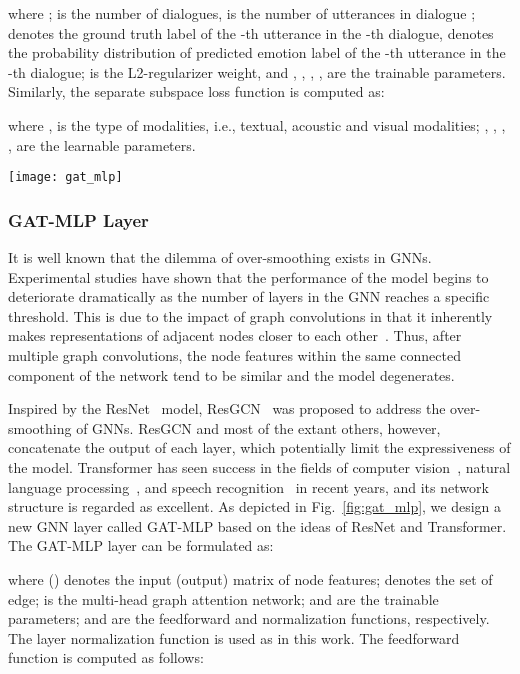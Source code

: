 \documentclass[lettersize,journal]{IEEEtran}
\begin{document}
where ;  is the number of dialogues,  is the number of utterances in dialogue ;  denotes the ground truth label of the -th utterance in the -th dialogue,  denotes the probability distribution of predicted emotion label of the -th utterance in the -th dialogue;  is the L2-regularizer weight, and , , , ,  are the trainable parameters. Similarly, the separate subspace loss function is computed as:


where ,  is the type of modalities, i.e., textual, acoustic and visual modalities; , , , ,  are the learnable parameters.

\begin{figure*}[htbp]
\centering
\texttt{[image: gat\_mlp]}\caption{The structure of the designed GAT-MLP, where the  operation can be placed before  and .  denotes the multi-head graph attention network; the layer normalization function is used for the  in our work.}
\label{fig:gat_mlp}
\end{figure*}

\subsubsection{GAT-MLP Layer}
It is well known that the dilemma of over-smoothing exists in GNNs. Experimental studies have shown that the performance of the model begins to deteriorate dramatically as the number of layers in the GNN reaches a specific threshold. This is due to the impact of graph convolutions in that it inherently makes representations of adjacent nodes closer to each other~\cite{li2018deeper}. Thus, after multiple graph convolutions, the node features within the same connected component of the network tend to be similar and the model degenerates.

Inspired by the ResNet~\cite{he2016deep} model, ResGCN~\cite{li2021deepgcns} was proposed to address the over-smoothing of GNNs. ResGCN and most of the extant others, however, concatenate the output of each layer, which potentially limit the expressiveness of the model. Transformer has seen success in the fields of computer vision~\cite{dosovitskiy2020image, liu2021swin}, natural language processing~\cite{vaswani2017attention}, and speech recognition~\cite{zhang2020transformer} in recent years, and its network structure is regarded as excellent. As depicted in Fig.~\ref{fig:gat_mlp}, we design a new GNN layer called GAT-MLP based on the ideas of ResNet and Transformer. The GAT-MLP layer can be formulated as:

where  () denotes the input (output) matrix of node features;  denotes the set of edge;  is the multi-head graph attention network;  and  are the trainable parameters;  and  are the feedforward and normalization functions, respectively. The layer normalization function is used as  in this work. The feedforward function is computed as follows:
\end{document}
